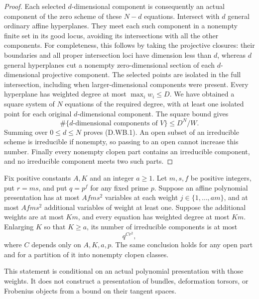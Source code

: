 \begin{proof}
Each selected $d$-dimensional component is consequently an
actual component of the zero scheme of these $N-d$ equations.
Intersect with $d$ general ordinary affine hyperplanes.
They meet each such component in a nonempty finite set in
its good locus, avoiding its intersections with all the
other components. For completeness, this follows by taking
the projective closures: their boundaries and all proper
intersection loci have dimension less than $d$, whereas
$d$ general hyperplanes cut a nonempty zero-dimensional
section of each $d$-dimensional projective component.
The selected points are isolated in the full intersection,
including when larger-dimensional components were present.
Every hyperplane has weighted degree at most $\max_iw_i\leq D$.
We have obtained a square system of $N$ equations of the
required degree, with at least one isolated point for each
original $d$-dimensional component. The square bound gives
\[
       \#\{\text{$d$-dimensional components of }V\}
                         \leq D^N/W.
\]
Summing over $0\leq d\leq N$ proves (D.WB.1).
An open subset of an irreducible scheme is irreducible if
nonempty, so passing to an open cannot increase this number.
Finally every nonempty clopen part contains an irreducible
component, and no irreducible component meets two such parts.
\end{proof}

\begin{corollary}
\label{D:weighted-normal-layer-budget}
Fix positive constants $A,K$ and an integer $a\geq1$.
Let $m,s,f$ be positive integers, put $r=ms$, and put $q=p^f$
for any fixed prime $p$. Suppose an affine polynomial
presentation has at most $Afms^2$ variables at each weight
$j\in\{1,\ldots,am\}$, and at most $Afms^2$ additional
variables of weight at least one. Suppose the additional
weights are at most $Km$, and every equation has weighted
degree at most $Km$. Enlarging $K$ so that $K\geq a$, its
number of irreducible components is at most
\[
                              q^{C r^2},                 \tag{D.WB.3}
\]
where $C$ depends only on $A,K,a,p$. The same conclusion
holds for any open part and for a partition of it into
nonempty clopen classes.

This statement is conditional on an actual polynomial
presentation with those weights. It does not construct a
presentation of bundles, deformation torsors, or Frobenius
objects from a bound on their tangent spaces.
\end{corollary}

